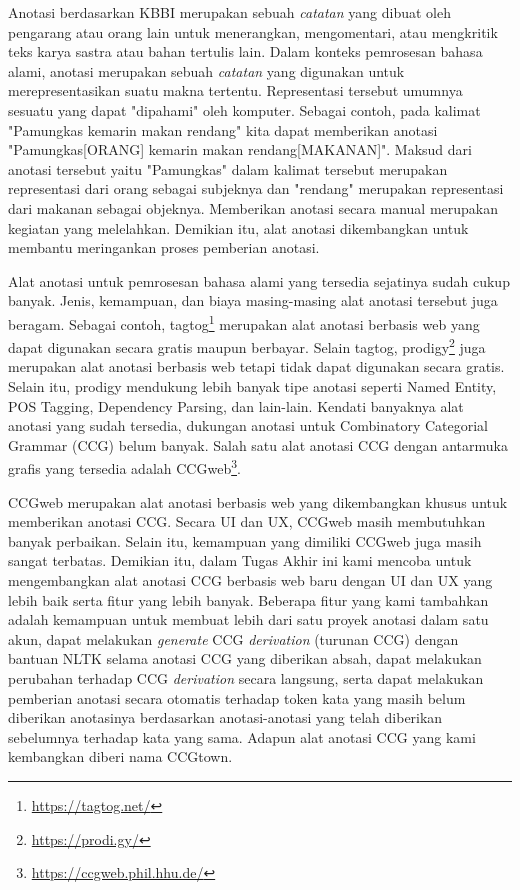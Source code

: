 Anotasi berdasarkan KBBI merupakan sebuah \textit{catatan} yang dibuat oleh pengarang atau
orang lain untuk menerangkan, mengomentari, atau mengkritik teks karya sastra atau
bahan tertulis lain. Dalam konteks pemrosesan bahasa alami, anotasi merupakan sebuah
\textit{catatan} yang digunakan untuk merepresentasikan suatu makna tertentu.
Representasi tersebut umumnya sesuatu yang dapat "dipahami" oleh komputer.
Sebagai contoh, pada kalimat "Pamungkas kemarin makan rendang" kita dapat memberikan anotasi
"Pamungkas[ORANG] kemarin makan rendang[MAKANAN]". Maksud dari anotasi tersebut yaitu "Pamungkas"
dalam kalimat tersebut merupakan representasi dari orang sebagai subjeknya dan "rendang"
merupakan representasi dari makanan sebagai objeknya. Memberikan anotasi secara manual merupakan
kegiatan yang melelahkan. Demikian itu, alat anotasi dikembangkan untuk membantu meringankan
proses pemberian anotasi.

Alat anotasi untuk pemrosesan bahasa alami yang tersedia sejatinya sudah cukup banyak.
Jenis, kemampuan, dan biaya masing-masing alat anotasi tersebut juga beragam. Sebagai contoh,
tagtog\footnote{\url{https://tagtog.net/}} merupakan alat anotasi berbasis web yang dapat digunakan
secara gratis maupun berbayar. Selain tagtog, prodigy\footnote{\url{https://prodi.gy/}} juga
merupakan alat anotasi berbasis web tetapi tidak dapat digunakan secara gratis. Selain itu, prodigy
mendukung lebih banyak tipe anotasi seperti Named Entity, POS Tagging, Dependency Parsing,
dan lain-lain. Kendati banyaknya alat anotasi yang sudah tersedia, dukungan anotasi untuk
Combinatory Categorial Grammar (CCG) belum banyak. Salah satu alat anotasi CCG dengan antarmuka
grafis yang tersedia adalah CCGweb\footnote{\url{https://ccgweb.phil.hhu.de/}}.

CCGweb merupakan alat anotasi berbasis web yang dikembangkan khusus untuk memberikan anotasi CCG.
Secara UI dan UX, CCGweb masih membutuhkan banyak perbaikan. Selain itu, kemampuan yang dimiliki
CCGweb juga masih sangat terbatas. Demikian itu, dalam Tugas Akhir ini kami mencoba untuk
mengembangkan alat anotasi CCG berbasis web baru dengan UI dan UX yang lebih baik serta
fitur yang lebih banyak. Beberapa fitur yang kami tambahkan adalah kemampuan untuk membuat lebih
dari satu proyek anotasi dalam satu akun, dapat melakukan \textit{generate} CCG \textit{derivation}
(turunan CCG) dengan bantuan NLTK selama anotasi CCG yang diberikan absah, dapat melakukan
perubahan terhadap CCG \textit{derivation} secara langsung, serta dapat melakukan pemberian anotasi
secara otomatis terhadap token kata yang masih belum diberikan anotasinya berdasarkan anotasi-anotasi
yang telah diberikan sebelumnya terhadap kata yang sama. Adapun alat anotasi CCG yang kami kembangkan
diberi nama CCGtown.

